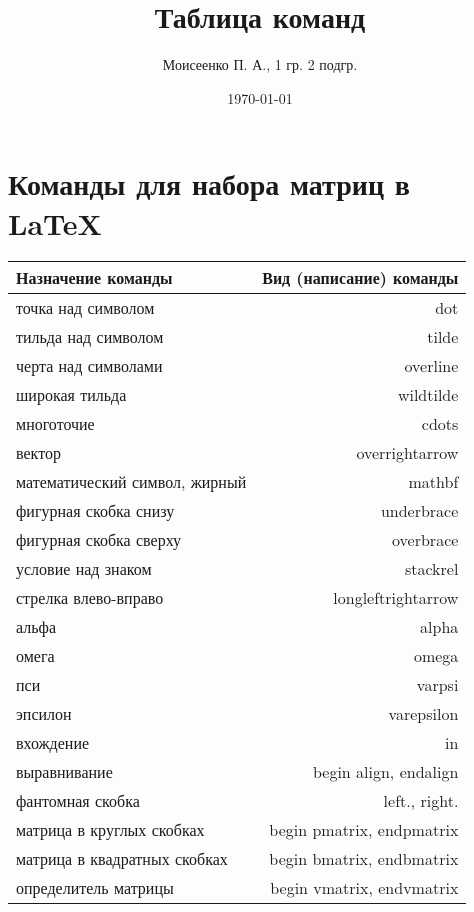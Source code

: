 \documentclass[a4paper,12pt]{article} %
\author{Моисеенко П. А., 1 гр. 2 подгр.} %
\title{Таблица команд} %
\date{\today} %
\begin{document}
\maketitle
\newpage
\section*{Команды для набора матриц в \LaTeX}
\begin{tabular}{ l | r }
  \textbf{Назначение команды}	& \textbf{Вид (написание) команды} \\ \hline
  точка над символом			& dot \\ \hline
  тильда над символом			& tilde \\ \hline
  черта над символами			& overline \\ \hline
  широкая тильда				& wildtilde \\ \hline
  многоточие					& cdots \\ \hline
  вектор						& overrightarrow \\ \hline
  математический символ, жирный	& mathbf \\ \hline
  фигурная скобка снизу			& underbrace \\ \hline
  фигурная скобка сверху		& overbrace \\ \hline
  условие над знаком			& stackrel \\ \hline
  стрелка влево-вправо			& longleftrightarrow \\ \hline
  альфа							& alpha \\ \hline
  омега							& omega \\ \hline
  пси							& varpsi \\ \hline
  эпсилон						& varepsilon \\ \hline
  вхождение						& in \\ \hline
  выравнивание					& begin {align}, end{align} \\ \hline
  фантомная скобка				& left., right. \\ \hline
  матрица в круглых скобках		& begin {pmatrix}, end{pmatrix} \\ \hline
  матрица в квадратных скобках	& begin {bmatrix}, end{bmatrix} \\ \hline
  определитель матрицы			& begin {vmatrix}, end{vmatrix}
\end{tabular}
\end{document}
